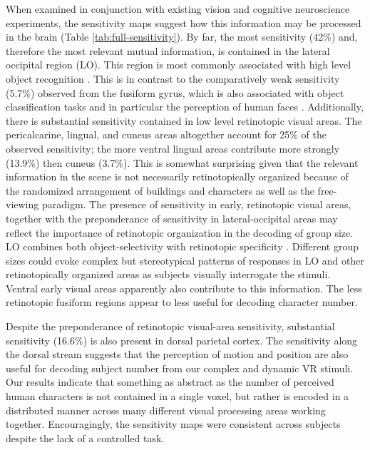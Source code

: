 \documentclass[review,1p,authoryear]{elsarticle}
\begin{document}
When examined in conjunction with existing vision and cognitive neuroscience experiments, the sensitivity maps suggest how this information may be processed in the brain (Table \ref{tab:full-sensitivity}).
By far, the most sensitivity (42\%) and, therefore the most relevant mutual information, is contained in the lateral occipital region (LO).
This region is most commonly associated with high level object recognition \citep{Grill-Spector2001}.
This is in contrast to the comparatively weak sensitivity (5.7\%) observed from the fusiform gyrus, which is also associated with object classification tasks and in particular the perception of human faces \citep{Kanwisher1997}.
Additionally, there is substantial sensitivity contained in low level retinotopic visual areas. 
The pericalcarine, lingual, and cuneus areas altogether account for 25\% of the observed sensitivity; the more ventral lingual areas contribute more strongly (13.9\%) then cuneus (3.7\%).
This is somewhat surprising given that the relevant information in the scene is not necessarily retinotopically organized because of the randomized arrangement of buildings and characters as well as the free-viewing paradigm.
The presence of sensitivity in early, retinotopic visual areas, together with the preponderance of sensitivity in lateral-occipital areas may reflect the importance of retinotopic organization in the decoding of group size. 
LO combines both object-selectivity with retinotopic specificity \citep{Sayres2008}. 
Different group sizes could evoke complex but stereotypical patterns of responses in LO and other retinotopically organized areas as subjects visually interrogate the stimuli. 
Ventral early visual areas apparently also contribute to this information. 
The less retinotopic fusiform regions \citep{Schwarzlose2008,Sayres2010} appear to less useful for decoding character number.

Despite the preponderance of retinotopic visual-area sensitivity, substantial sensitivity (16.6\%) is also present in dorsal parietal cortex. 
The sensitivity along the dorsal stream suggests that the perception of motion and position are also useful for decoding subject number from our complex and dynamic VR stimuli.
Our results indicate that something as abstract as the number of perceived human characters is not contained in a single voxel, but rather is encoded in a distributed manner across many different visual processing areas working together.
Encouragingly, the sensitivity maps were consistent across subjects despite the lack of a controlled task.
\end{document}
